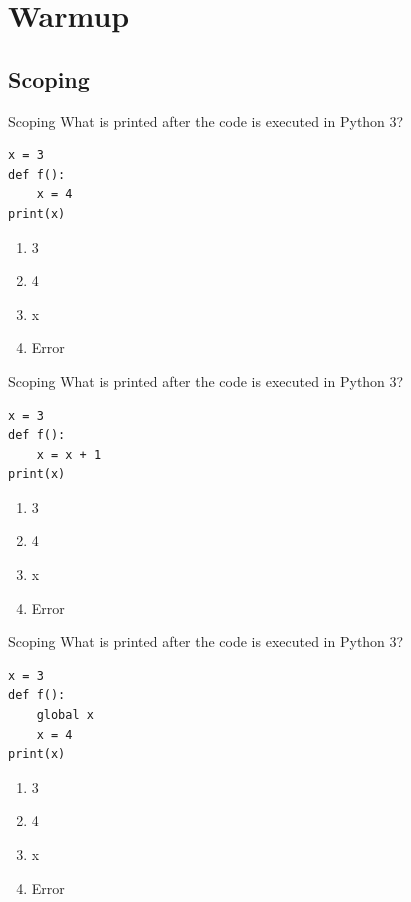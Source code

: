 \documentclass[9pt]{beamer}
\title{\themidterm}
\author{\theauthors}
\institute{\theorganization}
\date{\thedate}
\begin{document}

\begin{frame}
  \titlepage
\end{frame}

\section{Warmup}
\subsection{Scoping}
\begin{frame}[fragile]{Scoping}
  What is printed after the code is executed in Python 3?

  \begin{lstlisting}
x = 3
def f():
    x = 4
print(x)
  \end{lstlisting}

  \begin{enumerate}
    \item
      \alert<2>{3}
    \item
      4
    \item
      x
    \item
      Error
  \end{enumerate}
\end{frame}

\begin{frame}[fragile]{Scoping}
  What is printed after the code is executed in Python 3?

  \begin{lstlisting}
x = 3
def f():
    x = x + 1
print(x)
  \end{lstlisting}

  \begin{enumerate}
    \item
      3
    \item
      4
    \item
      x
    \item
      \alert<2>{Error}
  \end{enumerate}
\end{frame}

\begin{frame}[fragile]{Scoping}
  What is printed after the code is executed in Python 3?

  \begin{lstlisting}
x = 3
def f():
    global x
    x = 4
print(x)
  \end{lstlisting}

  \begin{enumerate}
    \item
      3
    \item
      \alert<2>{4}
    \item
      x
    \item
      Error
  \end{enumerate}
\end{frame}
\end{document}
